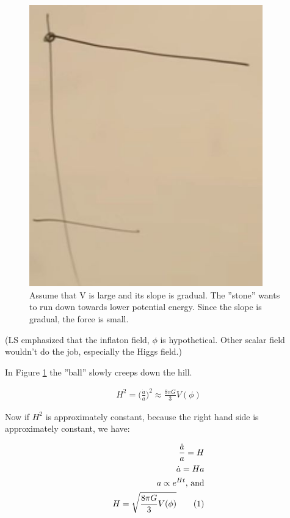 \documentclass[]{article}
\newcommand\numberthis{\addtocounter{equation}{1}\tag{\theequation}}
\begin{document}
\begin{figure}[H]
	\caption[V is large and its slope is gradual]{Assume that V is large and its slope is gradual. The ''stone'' wants to run down towards lower potential energy. Since the slope is gradual, the force is small.}\label{fig:cosmo-9-potential}
	\includegraphics[width=0.9\textwidth]{cosmo-9-potential}
\end{figure}

(LS emphasized that the inflaton field, $\phi$ is hypothetical. Other scalar field wouldn't do the job, especially the Higgs field.)

In Figure \ref{fig:cosmo-9-potential} the ''ball'' slowly creeps down the hill.

\begin{align*}
	H^2 = \big(\frac{\dot{a}}{a}\big)^2 \approx \frac{8\pi G}{3} V(\phi)
\end{align*}

Now if $H^2$ is approximately constant, because the right hand side is approximately constant, we have:

\begin{align*}
	\frac{\dot{a}}{a} = H\\
	\dot{a} = Ha\\
	a\propto e^{Ht} \text{, and}\\
	H = \sqrt{\frac{8\pi G}{3} V(\phi)} \numberthis \label{eq:H:V}
\end{align*}
\end{document}
